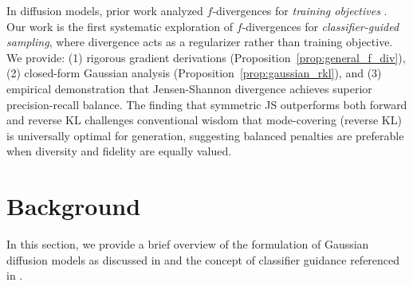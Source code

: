 \documentclass{article}
\begin{document}
In diffusion models, prior work analyzed $f$-divergences for \emph{training objectives} \cite{song2021maximum, kingma2023understanding}. Our work is the first systematic exploration of $f$-divergences for \emph{classifier-guided sampling}, where divergence acts as a regularizer rather than training objective. We provide: (1) rigorous gradient derivations (Proposition~\ref{prop:general_f_div}), (2) closed-form Gaussian analysis (Proposition~\ref{prop:gaussian_rkl}), and (3) empirical demonstration that Jensen-Shannon divergence achieves superior precision-recall balance. The finding that symmetric JS outperforms both forward and reverse KL challenges conventional wisdom that mode-covering (reverse KL) is universally optimal for generation, suggesting balanced penalties are preferable when diversity and fidelity are equally valued.


\section{Background}
In this section, we provide a brief overview of the formulation of Gaussian diffusion models as discussed in \cite{ho2020denoising} and the concept of classifier guidance referenced in \cite{dhariwal2021diffusion}.
\end{document}
